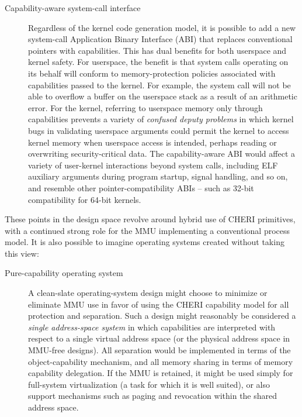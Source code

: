 \begin{description}
\item[Capability-aware system-call interface] Regardless of the kernel code
  generation model, it is possible to add a new system-call Application Binary
  Interface (ABI)
  that replaces conventional pointers with capabilities.
  This has dual benefits for both userspace and kernel safety.
  For userspace, the benefit is that system calls operating on its behalf will
  conform to memory-protection policies associated with capabilities passed to
  the kernel.
  For example, the  system call will not be able to overflow a
  buffer on the userspace stack as a result of an arithmetic error.
  For the kernel, referring to userspace memory only through capabilities
  prevents a variety of \textit{confused deputy problems} in which kernel bugs
  in validating userspace arguments could permit the kernel to access kernel
  memory when userspace access is intended, perhaps reading or overwriting
  security-critical data.
  The capability-aware ABI would affect a variety of user-kernel interactions
  beyond system calls, including ELF auxiliary arguments during program
  startup, signal handling, and so on, and resemble other
pointer-compatibility ABIs -- such as 32-bit compatibility for 64-bit kernels.
\end{description}

\noindent
These points in the design space revolve around hybrid use of CHERI
primitives, with a continued strong role for the MMU implementing a
conventional process model.
It is also possible to imagine operating systems created without taking this
view:

\begin{description}

\item[Pure-capability operating system] A clean-slate operating-system design
  might choose to minimize or eliminate MMU use in favor of using the CHERI
  capability model for all protection and separation.
  Such a design might reasonably be considered a \textit{single address-space
  system} in which capabilities are interpreted with respect to a single
  virtual address space (or the physical address space in MMU-free designs).
  All separation would be implemented in terms of the object-capability
  mechanism, and all memory sharing in terms of memory capability delegation.
  If the MMU is retained, it might be used simply for full-system
  virtualization (a task for which it is well suited), or also support
  mechanisms such as paging and revocation within the shared address space.

\end{description}

